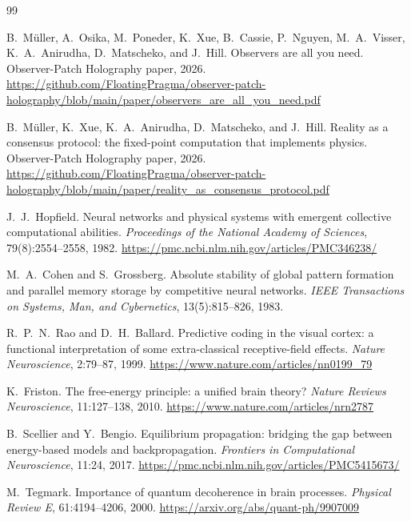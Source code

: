 \documentclass[11pt]{article}
\theoremstyle{remark}
\theoremstyle{plain}
\begin{document}
\begin{thebibliography}{99}

B.\ M\"uller, A.\ Osika, M.\ Poneder, K.\ Xue, B.\ Cassie, P.\ Nguyen, M.\ A.\ Visser, K.\ A.\ Anirudha, D.\ Matscheko, and J.\ Hill.
\newblock Observers are all you need.
\newblock Observer-Patch Holography paper, 2026.
\newblock \url{https://github.com/FloatingPragma/observer-patch-holography/blob/main/paper/observers_are_all_you_need.pdf}

B.\ M\"uller, K.\ Xue, K.\ A.\ Anirudha, D.\ Matscheko, and J.\ Hill.
\newblock Reality as a consensus protocol: the fixed-point computation that implements physics.
\newblock Observer-Patch Holography paper, 2026.
\newblock \url{https://github.com/FloatingPragma/observer-patch-holography/blob/main/paper/reality_as_consensus_protocol.pdf}

J.\ J.\ Hopfield.
\newblock Neural networks and physical systems with emergent collective computational abilities.
\newblock \emph{Proceedings of the National Academy of Sciences}, 79(8):2554--2558, 1982.
\newblock \url{https://pmc.ncbi.nlm.nih.gov/articles/PMC346238/}

M.\ A.\ Cohen and S.\ Grossberg.
\newblock Absolute stability of global pattern formation and parallel memory storage by competitive neural networks.
\newblock \emph{IEEE Transactions on Systems, Man, and Cybernetics}, 13(5):815--826, 1983.

R.\ P.\ N.\ Rao and D.\ H.\ Ballard.
\newblock Predictive coding in the visual cortex: a functional interpretation of some extra-classical receptive-field effects.
\newblock \emph{Nature Neuroscience}, 2:79--87, 1999.
\newblock \url{https://www.nature.com/articles/nn0199_79}

K.\ Friston.
\newblock The free-energy principle: a unified brain theory?
\newblock \emph{Nature Reviews Neuroscience}, 11:127--138, 2010.
\newblock \url{https://www.nature.com/articles/nrn2787}

B.\ Scellier and Y.\ Bengio.
\newblock Equilibrium propagation: bridging the gap between energy-based models and backpropagation.
\newblock \emph{Frontiers in Computational Neuroscience}, 11:24, 2017.
\newblock \url{https://pmc.ncbi.nlm.nih.gov/articles/PMC5415673/}

M.\ Tegmark.
\newblock Importance of quantum decoherence in brain processes.
\newblock \emph{Physical Review E}, 61:4194--4206, 2000.
\newblock \url{https://arxiv.org/abs/quant-ph/9907009}


\end{thebibliography}
\end{document}
